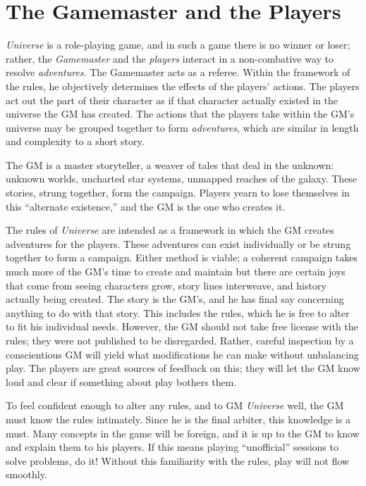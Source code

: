 \section{The Gamemaster and the Players}
\label{sec:gamemaster-players}

\emph{Universe} is a role-playing game, and in such a game there is no
winner or loser; rather, the \emph{Gamemaster} and the \emph{players}
interact in a non-combative way to resolve \emph{adventures}.  The
Gamemaster acts as a referee.  Within the framework of the rules, he
objectively determines the effects of the players' actions.  The
players act out the part of their character as if that character
actually existed in the universe the GM has created.  The actions that
the players take within the GM's universe may be grouped together to
form \emph{adventures}, which are similar in length and complexity to
a short story.

The GM is a master storyteller, a weaver of tales that deal in the
unknown: unknown worlds, uncharted star systems, unmapped reaches of
the galaxy.  These stories, strung together, form the campaign.  Players
yearn to lose themselves in this ``alternate existence,'' and the GM
is the one who creates it.

The rules of \emph{Universe} are intended as a framework in which the
GM creates adventures for the players.  These adventures can exist
individually or be strung together to form a campaign.  Either method
is viable; a coherent campaign takes much more of the GM's time to
create and maintain but there are certain joys that come from seeing
characters grow, story lines interweave, and history actually being
created.  The story is the GM's, and he has final say concerning
anything to do with that story.  This includes the rules, which he is
free to alter to fit his individual needs.  However, the GM should not
take free license with the rules; they were not published to be
disregarded.  Rather, careful inspection by a conscientious GM will
yield what modifications he can make without unbalancing play.  The
players are great sources of feedback on this; they will let the GM
know loud and clear if something about play bothers them.

To feel confident enough to alter any rules, and to GM \emph{Universe}
well, the GM must know the rules intimately.  Since he is the final
arbiter, this knowledge is a must.  Many concepts in the game will be
foreign, and it is up to the GM to know and explain them to his
players.  If this means playing ``unofficial'' sessions to solve
problems, do it! Without this familiarity with the rules, play will
not flow smoothly.

